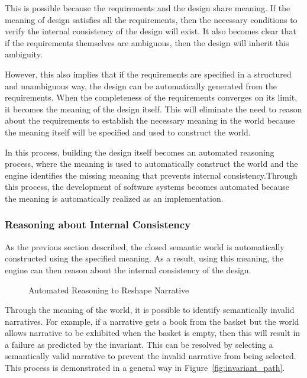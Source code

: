This is possible because the requirements and the design share meaning. If the meaning of design satisfies all the requirements, then the necessary conditions to verify the internal consistency of the design will exist. It also becomes clear that if the requirements themselves are ambiguous, then the design will inherit this ambiguity.

However, this also implies that if the requirements are specified in a structured and unambiguous way, the design can be automatically generated from the requirements. When the completeness of the requirements converges on its limit, it becomes the meaning of the design itself. This will eliminate the need to reason about the requirements to establish the necessary meaning in the world because the meaning itself will be specified and used to construct the world.

In this process, building the design itself becomes an automated reasoning process, where the meaning is used to automatically construct the world and the engine identifies the missing meaning that prevents internal consistency.Through this process, the development of software systems becomes automated because the meaning is automatically realized as an implementation.

\subsubsection{Reasoning about Internal Consistency}

As the previous section described, the closed semantic world is automatically constructed using the specified meaning. As a result, using this meaning, the engine can then reason about the internal consistency of the design. 

\begin{figure}[htbp]
    \centering
    
    \caption{Automated Reasoning to Reshape Narrative}
    \label{fig:reshape_design}
\end{figure}

Through the meaning of the world, it is possible to identify semantically invalid narratives. For example, if a narrative gets a book from the basket but the world allows narrative to be exhibited when the basket is empty, then this will result in a failure as predicted by the invariant. This can be resolved by selecting a semantically valid narrative to prevent the invalid narrative from being selected. This process is demonstrated in a general way in Figure~\ref{fig:invariant_path}. 

